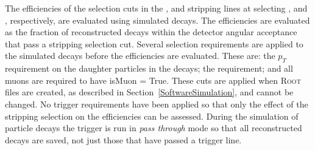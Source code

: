 
The efficiencies of the selection cuts in the \bmumu, \bhh and \bujpsik stripping lines at selecting \bmumu, \bhh and \bujpsik, respectively, are evaluated using simulated decays. 
The efficiencies are evaluated as the fraction of reconstructed decays within the detector angular acceptance that pass a stripping selection cut.
Several selection requirements are applied to the simulated decays before the efficiencies are evaluated. These are: the $p_T$ requirement on the daughter particles in the decays; the \chitrk requirement; and all muons are required to have isMuon = True. These cuts are applied when \textsc{Root} files are created, as described in Section~\ref{SoftwareSimulation}, and cannot be changed.
No trigger requirements have been applied so that only the effect of the stripping selection on the efficiencies can be assessed. During the simulation of particle decays the trigger is run in {\it pass through} mode so that all reconstructed decays are saved, not just those that have passed a trigger line.


